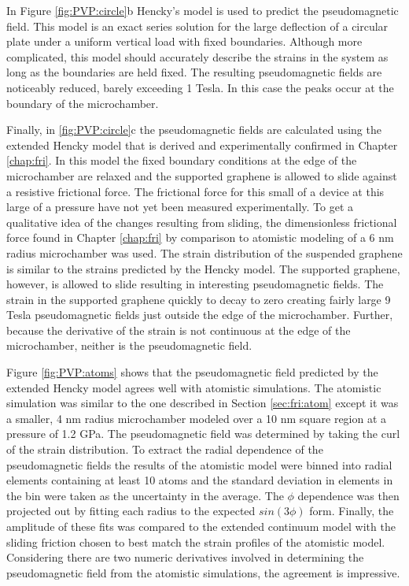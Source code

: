 In Figure \ref{fig:PVP:circle}b Hencky's model is used to predict the pseudomagnetic field.
This model is an exact series solution for the large deflection of a circular plate under a uniform vertical load with fixed boundaries.
Although more complicated, this model should accurately describe the strains in the system as long as the boundaries are held fixed.
The resulting pseudomagnetic fields are noticeably reduced, barely exceeding 1 Tesla.
In this case the peaks occur at the boundary of the microchamber.

Finally, in \ref{fig:PVP:circle}c the pseudomagnetic fields are calculated using the extended Hencky model that is derived and experimentally confirmed in Chapter \ref{chap:fri}.
In this model the fixed boundary conditions at the edge of the microchamber are relaxed and the supported graphene is allowed to slide against a resistive frictional force.
The frictional force for this small of a device at this large of a pressure have not yet been measured experimentally.
To get a qualitative idea of the changes resulting from sliding, the dimensionless frictional force found in Chapter \ref{chap:fri} by comparison to atomistic modeling of a 6 nm radius microchamber was used.
The strain distribution of the suspended graphene is similar to the strains predicted by the Hencky model.
The supported graphene, however, is allowed to slide resulting in interesting pseudomagnetic fields.
The strain in the supported graphene quickly to decay to zero creating fairly large 9 Tesla pseudomagnetic fields just outside the edge of the microchamber.
Further, because the derivative of the strain is not continuous at the edge of the microchamber, neither is the pseudomagnetic field.

Figure \ref{fig:PVP:atoms} shows that the pseudomagnetic field predicted by the extended Hencky model agrees well with atomistic simulations.
The atomistic simulation was similar to the one described in Section \ref{sec:fri:atom} except it was a smaller, 4 nm radius microchamber modeled over a 10 nm square region at a pressure of 1.2 GPa.
The pseudomagnetic field was determined by taking the curl of the strain distribution.
To extract the radial dependence of the pseudomagnetic fields the results of the atomistic model were binned into radial elements containing at least 10 atoms and the standard deviation in elements in the bin were taken as the uncertainty in the average.
The $\phi$ dependence was then projected out by fitting each radius to the expected $sin(3 \phi)$ form.
Finally, the amplitude of these fits was compared to the extended continuum model with the sliding friction chosen to best match the strain profiles of the atomistic model.
Considering there are two numeric derivatives involved in determining the pseudomagnetic field from the atomistic simulations, the agreement is impressive.

